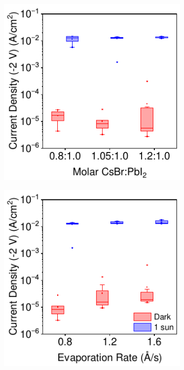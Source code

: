 \begin{figure}[htbp]
    \centering
    
    \begin{subfigure}[t]{0.45\textwidth}
        \centering
        \includegraphics[width=\textwidth]{chapters/transport_layers/images/JV_Box_Ratio.pdf} %
        \caption{}
        \label{fig:etl_opt:molar_ratio}
    \end{subfigure}
    \hfill
        \begin{subfigure}[t]{0.45\textwidth}
        \centering
        \includegraphics[width=\textwidth]{chapters/transport_layers/images/Evap_Rate_Box_Plot.pdf} %

\end{subfigure}
\end{figure}
